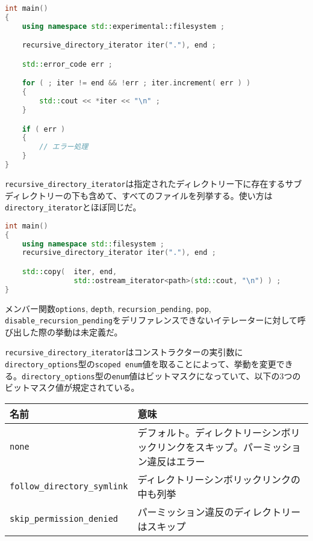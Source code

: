 \begin{lstlisting}[language=C++]
int main()
{
    using namespace std::experimental::filesystem ; 

    recursive_directory_iterator iter("."), end ;

    std::error_code err ;

    for ( ; iter != end && !err ; iter.increment( err ) )
    {
        std::cout << *iter << "\n" ;
    }

    if ( err )
    {
        // エラー処理
    }
}
\end{lstlisting}

%

\lstinline!recursive_directory_iterator!は指定されたディレクトリー下に存在するサブディレクトリーの下も含めて、すべてのファイルを列挙する。使い方は\lstinline!directory_iterator!とほぼ同じだ。

\begin{lstlisting}[language=C++]
int main()
{
    using namespace std::filesystem ; 
    recursive_directory_iterator iter("."), end ;

    std::copy(  iter, end,
                std::ostream_iterator<path>(std::cout, "\n") ) ;
}
\end{lstlisting}

メンバー関数\lstinline!options!, \lstinline!depth!,
\lstinline!recursion_pending!, \lstinline!pop!,
\lstinline!disable_recursion_pending!をデリファレンスできないイテレーターに対して呼び出した際の挙動は未定義だ。

%

\lstinline!recursive_directory_iterator!はコンストラクターの実引数に\lstinline!directory_options!型の\lstinline!scoped enum!値を取ることによって、挙動を変更できる。\lstinline!directory_options!型の\lstinline!enum!値はビットマスクになっていて、以下の3つのビットマスク値が規定されている。

\small
\begin{longtable}[l]{@{\ \ }p{}p{}@{\ \ }}
\toprule
名前 & 意味\tabularnewline
\midrule
\endhead
\lstinline!none! &
デフォルト。ディレクトリーシンボリックリンクをスキップ。パーミッション違反はエラー\tabularnewline
\lstinline!follow_directory_symlink! &
ディレクトリーシンボリックリンクの中も列挙\tabularnewline
\lstinline!skip_permission_denied! &
パーミッション違反のディレクトリーはスキップ\tabularnewline
\bottomrule
\end{longtable}
\normalsize

